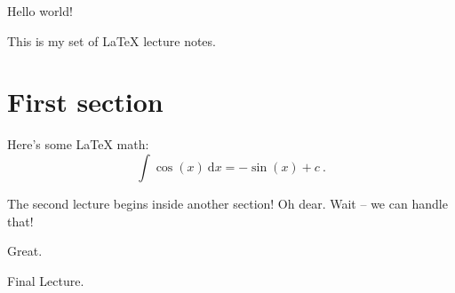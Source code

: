 Hello world!

This is my set of LaTeX lecture notes.

\section{First section}

Here's some LaTeX math:
$$
    \int \cos(x) ~ \mathrm{d} x = - \sin(x) + c~.
$$


The second lecture begins inside another section! Oh dear. Wait -- we can handle that!

Great.


Final Lecture.

